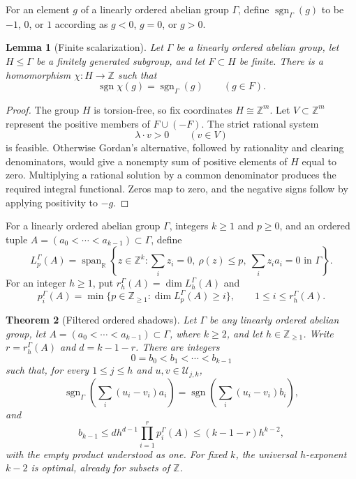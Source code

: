 \documentclass[11pt,reqno]{amsart}
\newtheorem{theorem}{Theorem}[section]
\newtheorem{lemma}[theorem]{Lemma}
\theoremstyle{definition}
\theoremstyle{remark}
\begin{document}
For an element $g$ of a linearly ordered abelian group $\Gamma$, define
$\operatorname{sgn}_{\Gamma}(g)$ to be $-1$, $0$, or $1$ according as
$g<0$, $g=0$, or $g>0$.

\begin{lemma}[Finite scalarization]
\label{lem:finite-scalarization}
Let $\Gamma$ be a linearly ordered abelian group, let $H\leq\Gamma$ be a
finitely generated subgroup, and let $F\subset H$ be finite.  There is a
homomorphism $\chi:H\to\mathbb Z$ such that
\[
 \operatorname{sgn}\chi(g)=\operatorname{sgn}_{\Gamma}(g)
 \qquad(g\in F).
\]
\end{lemma}

\begin{proof}
The group $H$ is torsion-free, so fix coordinates $H\cong\mathbb Z^m$.
Let $V\subset\mathbb Z^m$ represent the positive members of
$F\cup(-F)$.  The strict rational system
\[
 \lambda\cdot v>0\qquad(v\in V)
\]
is feasible.  Otherwise Gordan's alternative, followed by rationality and
clearing denominators, would give a nonempty sum of positive elements of
$H$ equal to zero.  Multiplying a rational solution by a common denominator
produces the required integral functional.  Zeros map to zero, and the
negative signs follow by applying positivity to $-g$.
\end{proof}

For a linearly ordered abelian group $\Gamma$, integers $k\geq1$ and
$p\geq0$, and an ordered tuple
$A=(a_0<\cdots<a_{k-1})\subset\Gamma$, define
\[
 L_p^\Gamma(A)=\operatorname{span}_{\mathbb R}
 \left\{z\in\mathbb Z^k:
   \sum_i z_i=0,\ \rho(z)\leq p,\
   \sum_i z_i a_i=0\text{ in }\Gamma\right\}.
\]
For an integer $h\geq1$, put $r_h^\Gamma(A)=\dim L_h^\Gamma(A)$ and
\[
 p_i^\Gamma(A)=
 \min\{p\in\mathbb Z_{\geq1}:\dim L_p^\Gamma(A)\geq i\},
 \qquad 1\leq i\leq r_h^\Gamma(A).
\]

\begin{theorem}[Filtered ordered shadows]
\label{thm:ordered-group-shadow}
Let $\Gamma$ be any linearly ordered abelian group, let
$A=(a_0<\cdots<a_{k-1})\subset\Gamma$, where $k\geq2$, and let
$h\in\mathbb Z_{\geq1}$.  Write
$r=r_h^\Gamma(A)$ and $d=k-1-r$.  There are integers
\[
 0=b_0<b_1<\cdots<b_{k-1}
\]
such that, for every $1\leq j\leq h$ and $u,v\in\mathcal U_{j,k}$,
\begin{equation}\label{eq:ordered-group-shadow-signs}
 \operatorname{sgn}_{\Gamma}\!\left(\sum_i(u_i-v_i)a_i\right)
 =\operatorname{sgn}\!\left(\sum_i(u_i-v_i)b_i\right),
\end{equation}
and
\begin{equation}\label{eq:ordered-group-shadow-height}
 b_{k-1}
 \leq d h^{d-1}\prod_{i=1}^{r}p_i^\Gamma(A)
 \leq(k-1-r)h^{k-2},
\end{equation}
with the empty product understood as one.  For fixed $k$, the universal
$h$-exponent $k-2$ is optimal, already for subsets of $\mathbb Z$.
\end{theorem}
\end{document}
